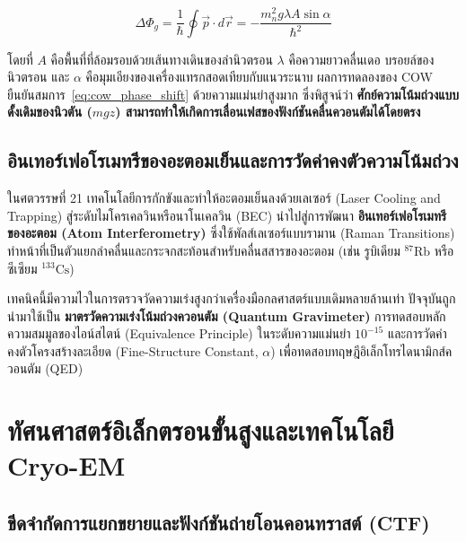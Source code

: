 \begin{equation}
\Delta\Phi_g = \frac{1}{\hbar}\oint \vec{p}\cdot d\vec{r} = -\frac{m_n^2 g \lambda A \sin\alpha}{\hbar^2}
\label{eq:cow_phase_shift}
\end{equation}

โดยที่ $A$ คือพื้นที่ที่ล้อมรอบด้วยเส้นทางเดินของลำนิวตรอน $\lambda$ คือความยาวคลื่นเดอ บรอยล์ของนิวตรอน และ $\alpha$ คือมุมเอียงของเครื่องแทรกสอดเทียบกับแนวระนาบ ผลการทดลองของ COW ยืนยันสมการ~\eqref{eq:cow_phase_shift} ด้วยความแม่นยำสูงมาก ซึ่งพิสูจน์ว่า \textbf{ศักย์ความโน้มถ่วงแบบดั้งเดิมของนิวตัน ($m g z$) สามารถทำให้เกิดการเลื่อนเฟสของฟังก์ชันคลื่นควอนตัมได้โดยตรง}

\subsection{อินเทอร์เฟอโรเมทรีของอะตอมเย็นและการวัดค่าคงตัวความโน้มถ่วง}

ในศตวรรษที่ 21 เทคโนโลยีการกักขังและทำให้อะตอมเย็นลงด้วยเลเซอร์ (Laser Cooling and Trapping) สู่ระดับไมโครเคลวินหรือนาโนเคลวิน (BEC) นำไปสู่การพัฒนา \textbf{อินเทอร์เฟอโรเมทรีของอะตอม (Atom Interferometry)} ซึ่งใช้พัลส์เลเซอร์แบบรามาน (Raman Transitions) ทำหน้าที่เป็นตัวแยกลำคลื่นและกระจกสะท้อนสำหรับคลื่นสสารของอะตอม (เช่น รูบิเดียม $^{87}\text{Rb}$ หรือซีเซียม $^{133}\text{Cs}$)

เทคนิคนี้มีความไวในการตรวจวัดความเร่งสูงกว่าเครื่องมือกลศาสตร์แบบเดิมหลายล้านเท่า ปัจจุบันถูกนำมาใช้เป็น \textbf{มาตรวัดความเร่งโน้มถ่วงควอนตัม (Quantum Gravimeter)} การทดสอบหลักความสมมูลของไอน์สไตน์ (Equivalence Principle) ในระดับความแม่นยำ $10^{-15}$ และการวัดค่าคงตัวโครงสร้างละเอียด (Fine-Structure Constant, $\alpha$) เพื่อทดสอบทฤษฎีอิเล็กโทรไดนามิกส์ควอนตัม (QED)

\section{ทัศนศาสตร์อิเล็กตรอนขั้นสูงและเทคโนโลยี Cryo-EM}

\subsection{ขีดจำกัดการแยกขยายและฟังก์ชันถ่ายโอนคอนทราสต์ (CTF)}

